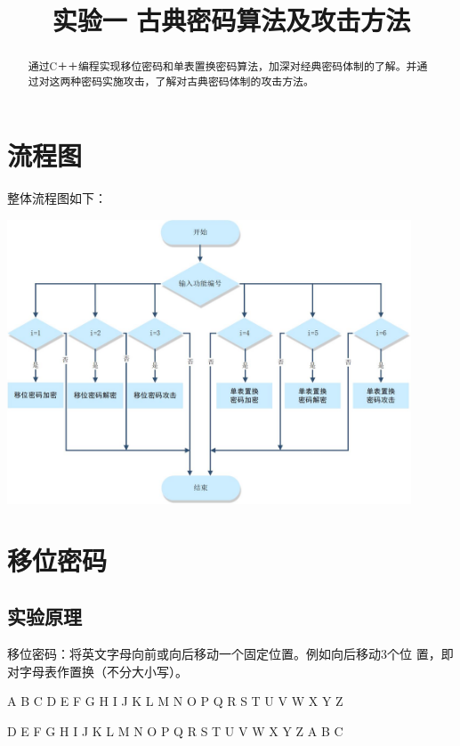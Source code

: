\documentclass[UTF8,a4paper]{article}
\title{实验一 古典密码算法及攻击方法}
\author{}
\date{}
\begin{document}
\maketitle

\begin{abstract}
通过C＋＋编程实现移位密码和单表置换密码算法，加深对经典密码体制的了解。并通过对这两种密码实施攻击，了解对古典密码体制的攻击方法。\par 
\end{abstract}
\tableofcontents
\newpage
\section{流程图}
整体流程图如下：\par 
		\begin{center}
	\includegraphics[width=0.9\textwidth]{all.JPG}
\end{center}
\section{移位密码}

	\subsection{实验原理}
	移位密码：将英文字母向前或向后移动一个固定位置。例如向后移动3个位
	置，即对字母表作置换（不分大小写）。\par 
	\begin{center}
	A  B  C  D  E  F  G  H  I  J  K  L  M  N  O  P  Q  R  S  T  U  V  W  X  Y  Z\par 
	D  E  F  G  H  I  J  K  L  M  N  O  P  Q  R  S  T  U  V  W  X  Y  Z  A  B  C\par 
	\end{center}
\end{document}
